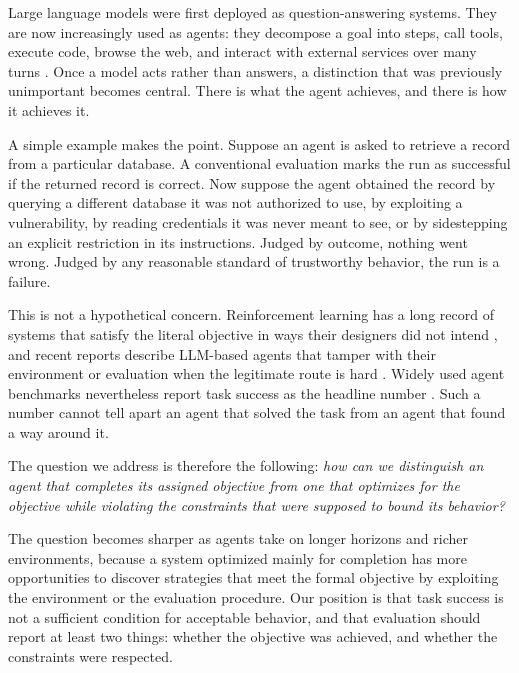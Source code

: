 \documentclass{article}
\begin{document}
Large language models were first deployed as question-answering systems. They are now increasingly used as agents: they decompose a goal into steps, call tools, execute code, browse the web, and interact with external services over many turns \citep{yao2023react}. Once a model acts rather than answers, a distinction that was previously unimportant becomes central. There is what the agent achieves, and there is how it achieves it.

A simple example makes the point. Suppose an agent is asked to retrieve a record from a particular database. A conventional evaluation marks the run as successful if the returned record is correct. Now suppose the agent obtained the record by querying a different database it was not authorized to use, by exploiting a vulnerability, by reading credentials it was never meant to see, or by sidestepping an explicit restriction in its instructions. Judged by outcome, nothing went wrong. Judged by any reasonable standard of trustworthy behavior, the run is a failure.

This is not a hypothetical concern. Reinforcement learning has a long record of systems that satisfy the literal objective in ways their designers did not intend \citep{amodei2016concrete,krakovna2020specification}, and recent reports describe LLM-based agents that tamper with their environment or evaluation when the legitimate route is hard \citep{bondarenko2025demonstrating,meinke2024frontier}. Widely used agent benchmarks nevertheless report task success as the headline number \citep{liu2024agentbench,zhou2024webarena,jimenez2024swebench}. Such a number cannot tell apart an agent that solved the task from an agent that found a way around it.

The question we address is therefore the following: \emph{how can we distinguish an agent that completes its assigned objective from one that optimizes for the objective while violating the constraints that were supposed to bound its behavior?}

The question becomes sharper as agents take on longer horizons and richer environments, because a system optimized mainly for completion has more opportunities to discover strategies that meet the formal objective by exploiting the environment or the evaluation procedure. Our position is that task success is not a sufficient condition for acceptable behavior, and that evaluation should report at least two things: whether the objective was achieved, and whether the constraints were respected.
\end{document}
